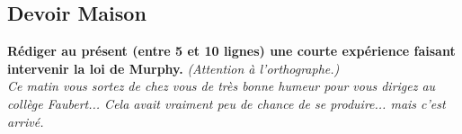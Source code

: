 \documentclass[11pt]{article}
\begin{document}
\subsection*{Devoir Maison}

\textbf{Rédiger au présent (entre 5 et 10 lignes) une courte expérience faisant intervenir la loi de Murphy.}
\textit{(Attention à l'orthographe.)}\\

\textit{Ce matin vous sortez de chez vous de très bonne humeur pour vous dirigez au collège Faubert... Cela avait vraiment peu de chance de se produire... mais c'est arrivé.}\\

\Pointilles[18]
\end{document}
